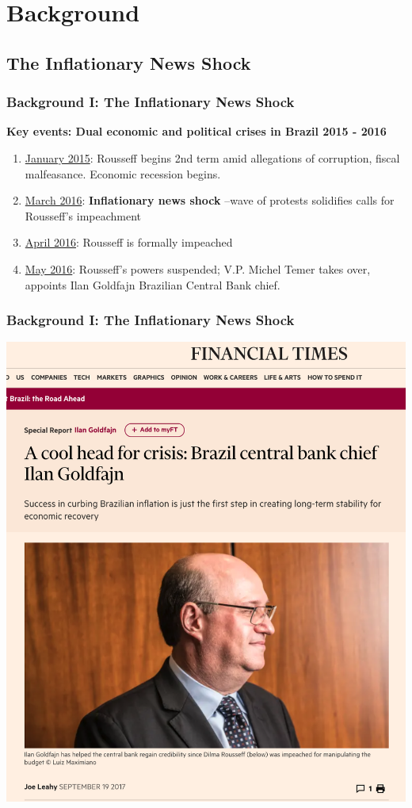 \documentclass[aspectratio=169]{beamer}
\begin{document}
	\section{Background}
		\subsection{The Inflationary News Shock}
			\begin{frame}
				\frametitle{Background I: The Inflationary News Shock}
				\centering
			 	\textbf{Key events: Dual economic and political crises in Brazil 2015 - 2016}
				\begin{enumerate}
					\item \underline{January 2015}: Rousseff begins 2nd term amid allegations of corruption, fiscal malfeasance. Economic recession begins.
					\item \underline{March 2016}: \textbf{Inflationary news shock} \---wave of protests solidifies calls for Rousseff's impeachment
					\item \underline{April 2016}: Rousseff is formally impeached
					\item \underline{May 2016}: Rousseff's powers suspended; V.P. Michel Temer takes over, appoints Ilan Goldfajn Brazilian Central Bank chief.
				\end{enumerate}
			\end{frame}

			\begin{frame}
				\frametitle{Background I: The Inflationary News Shock}
				\centering
				\includegraphics[scale=.3]{old_figures/goldfajn.png}
			\end{frame}	
\end{document}
